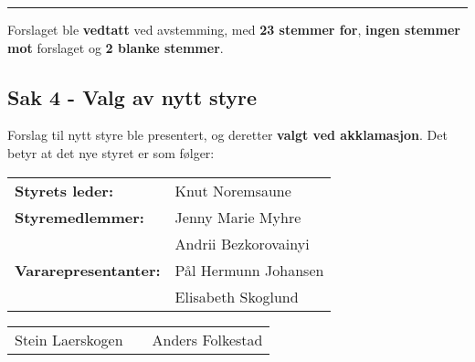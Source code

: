 \documentclass[12pt]{article}
\begin{document}
{\rule{\textwidth}{0.3pt}}

Forslaget ble {\bf vedtatt} ved avstemming, med {\bf 23 stemmer for}, {\bf ingen stemmer mot}
forslaget og {\bf 2 blanke stemmer}.

\subsection*{Sak 4 - Valg av nytt styre}

Forslag til nytt styre ble presentert, og deretter {\bf valgt ved akklamasjon}. Det betyr at det
nye styret er som følger:

\begin{tabular}{@{\hspace{4em}}ll}
  {\bf Styrets leder:} & Knut Noremsaune
  \vspace{1ex}\\
  {\bf Styremedlemmer:} & Jenny Marie Myhre \\
  & Andrii Bezkorovainyi
  \vspace{1ex}\\
  {\bf Vararepresentanter:} & Pål Hermunn Johansen\\
  & Elisabeth Skoglund
\end{tabular}\medskip

\vspace{3cm}

\begin{center}
\bgroup
\def\arraystretch{1.5}
\begin{tabular}{ccc}\cline{1-1}\cline{3-3}
  \hspace{2em}Stein Laerskogen\hspace{2em} & \hspace{7em} & \hspace{2em}Anders Folkestad\hspace{2em}
\end{tabular}
\egroup
\end{center}
\end{document}
